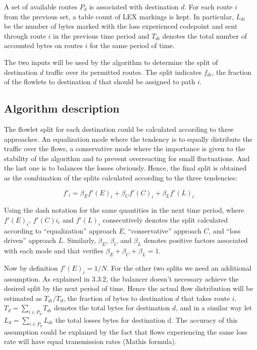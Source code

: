 A set of available routes $P_{d}$ is associated with destination $d$. For each route $i$ from the previous set, a table count of LEX markings is kept. In particular, $L_{di}$ be the number of bytes marked with the loss experienced codepoint and sent through route $i$ in the previous time period and $T_{di}$ denotes the total number of accounted bytes on routes $i$ for the same period of time. 

The two inputs will be used by the algorithm to determine the split of destination $d$ traffic over its permitted routes. The split indicates $f_{di}$, the fraction of the flowlets to destination $d$ that should be assigned to path $i$. 

\subsection{Algorithm description}

The flowlet split for each destination could be calculated according to three approaches. An equalization mode where the tendency is to equally distribute the traffic over the flows, a conservative mode where the importance is given to the stability of the algorithm and to prevent overreacting for small fluctuations. And the last one is to balances the losses obviously.
Hence, the final split is obtained as the combination of the splits calculated according to the three tendencies:

\begin{equation}
f'_{i} = \beta_{E}f'(E)_{i} + \beta_{C}f'(C)_{i} + \beta_{L}f'(L)_{i}
\end{equation}

Using the dash notation for the same quantities in the next time period, where $f'(E)_{i}$, $f'(C)i_{i}$ and $f'(L)_{i}$ consecutively denotes the split calculated according to “equalization” approach $E$, “conservative” approach $C$, and “loss driven” approach $L$. Similarly, $\beta_{E}$, $\beta_{C}$ and $\beta_{L}$ denotes positive factors associated with each mode and that verifies $\beta_{E}+\beta_{C}+\beta_{L} = 1$. 

Now by definition $f'(E)_{i} = 1/N$. For the other two splits we need an additional assumption. As explained in 3.3.2,  the balancer doesn't necessary achieve the desired split by the next period of time. Hence the actual flow distribution will be estimated as $T_{di}/ T_{d}$, the fraction of bytes to destination $d$ that takes route $i$. $T_{d} = \sum_{i \in P_{d}}T_{di}$ denotes the total bytes for destination $d$,  and in a similar way let $L_{d} = \sum_{i \in P_{d}}L_{di}$ the total losses bytes for destination d. The accuracy of this assumption could be explained by the fact that flows experiencing the same loss rate will have equal transmission rates (Mathis formula).


